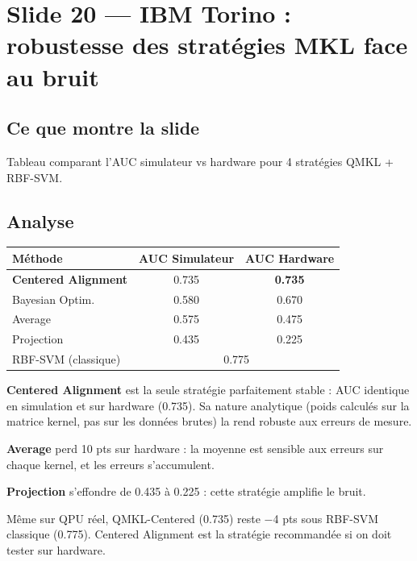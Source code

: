 \documentclass[12pt, a4paper]{article}
\begin{document}
\section{Slide 20 — IBM Torino : robustesse des stratégies MKL face au bruit}

\subsection*{Ce que montre la slide}

Tableau comparant l'AUC simulateur vs hardware pour 4 stratégies QMKL + RBF-SVM.

\subsection*{Analyse}

\begin{center}
\begin{tabular}{lcc}
  \toprule
  \textbf{Méthode} & \textbf{AUC Simulateur} & \textbf{AUC Hardware} \\
  \midrule
  \textbf{Centered Alignment} & 0.735 & \textbf{0.735} \\
  Bayesian Optim.             & 0.580 & 0.670 \\
  Average                     & 0.575 & 0.475 \\
  Projection                  & 0.435 & 0.225 \\
  \midrule
  RBF-SVM (classique)         & \multicolumn{2}{c}{0.775} \\
  \bottomrule
\end{tabular}
\end{center}

\textbf{Centered Alignment} est la seule stratégie parfaitement stable :
AUC identique en simulation et sur hardware (0.735).
Sa nature analytique (poids calculés sur la matrice kernel, pas sur les données brutes)
la rend robuste aux erreurs de mesure.

\textbf{Average} perd 10 pts sur hardware : la moyenne est sensible aux erreurs
sur chaque kernel, et les erreurs s'accumulent.

\textbf{Projection} s'effondre de 0.435 à 0.225 : cette stratégie amplifie le bruit.

\begin{retenir}
Même sur QPU réel, QMKL-Centered (0.735) reste $-$4 pts sous RBF-SVM classique (0.775).
Centered Alignment est la stratégie recommandée si on doit tester sur hardware.
\end{retenir}
\end{document}
